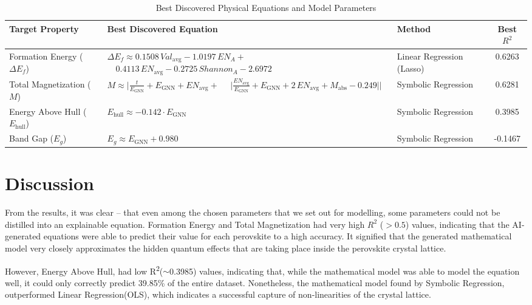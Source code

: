 \documentclass[12pt,onecolumn]{elsarticle}
\begin{document}
\begin{table}[H]
\centering
\small
\caption{Best Discovered Physical Equations and Model Parameters}
\label{tab:best_equations}
\begin{tabularx}{\textwidth}{l X >{\raggedright\arraybackslash}p{2.8cm} c}
\toprule
\textbf{Target Property} & \textbf{Best Discovered Equation} & \textbf{Method} & \textbf{Best $R^2$} \\
\midrule
Formation Energy ($\Delta E_f$) & $\Delta E_f \approx 0.1508 \, Val_{\text{avg}} - 1.0197 \, EN_A + {}$ \newline $\quad 0.4113 \, EN_{\text{avg}} - 0.2725 \, Shannon_A - 2.6972$ & Linear Regression (Lasso) & 0.6263 \\
\addlinespace
Total Magnetization ($M$) & $M \approx \Big| \frac{t}{E_{\text{GNN}}} + E_{\text{GNN}} + EN_{\text{avg}} + {}$ \newline $\quad \Big| \frac{EN_{\text{avg}}}{E_{\text{GNN}}} + E_{\text{GNN}} + 2 \, EN_{\text{avg}} + M_{\text{abs}} - 0.249 \Big| \Big|$ & Symbolic Regression & 0.6281 \\
\addlinespace
Energy Above Hull ($E_{\text{hull}}$) & $E_{\text{hull}} \approx -0.142 \cdot E_{\text{GNN}}$ & Symbolic Regression & 0.3985 \\
\addlinespace
Band Gap ($E_g$) & $E_g \approx E_{\text{GNN}} + 0.980$ & Symbolic Regression & -0.1467 \\
\bottomrule
\end{tabularx}
\end{table}

\clearpage

\section{Discussion}
From the results, it was clear – that even among the chosen parameters that we set out for modelling, some parameters could not be distilled into an explainable equation.
Formation Energy and Total Magnetization had very high $R^2$ ($> 0.5$) values, indicating that the AI-generated equations were able to predict their value for each perovskite to a high accuracy. It signified that the generated mathematical model very closely approximates the hidden quantum effects that are taking place inside the perovskite crystal lattice.

However, Energy Above Hull, had low R\textsuperscript{2}(\(\sim\)0.3985) values, indicating that, while the mathematical model was able to model the equation well, it could only correctly predict 39.85\% of the entire dataset. Nonetheless, the mathematical model found by Symbolic Regression, outperformed Linear Regression(OLS), which indicates a successful capture of non-linearities of the crystal lattice.
\end{document}

